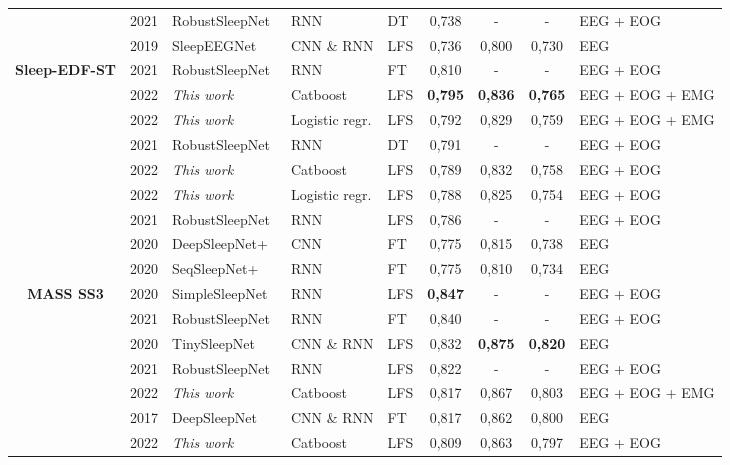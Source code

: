 \documentclass[runningheads]{llncs}
\begin{document}
\begin{table}[htbp]
{\begin{tabular}{c|p{}p{}p{}p{}|ccc|l}
 & 2021 & RobustSleepNet~\cite{guillot2021robustsleepnet} & RNN & DT & 0,738 & - & - & EEG + EOG \\
 & 2019 & SleepEEGNet~\cite{mousavi2019sleepeegnet} & CNN \& RNN & LFS & 0,736 & 0,800 & 0,730 & EEG \\
\midrule
\multirow{9}{*}{\textbf{Sleep-EDF-ST}} & 2021 & RobustSleepNet~\cite{guillot2021robustsleepnet} & RNN & FT & 0,810 & - & - & EEG + EOG \\
 & 2022 & \textit{This work} & Catboost & LFS & \textbf{0,795} & \textbf{0,836} & \textbf{0,765} & EEG + EOG + EMG \\
 & 2022 & \textit{This work} & Logistic regr. & LFS & 0,792 & 0,829 & 0,759 & EEG + EOG + EMG \\
 & 2021 & RobustSleepNet~\cite{guillot2021robustsleepnet} & RNN & DT & 0,791 & - & - & EEG + EOG \\
& 2022 & \textit{This work} & Catboost & LFS & 0,789 & 0,832 & 0,758 & EEG + EOG \\
 & 2022 & \textit{This work} & Logistic regr. & LFS & 0,788 & 0,825 & 0,754 & EEG + EOG \\
 & 2021 & RobustSleepNet~\cite{guillot2021robustsleepnet} & RNN & LFS & 0,786 & - & - & EEG + EOG \\
 & 2020 & DeepSleepNet+~\cite{phan2020towards} & CNN & FT & 0,775 & 0,815 & 0,738 & EEG \\
 & 2020 & SeqSleepNet+~\cite{phan2020towards} & RNN & FT & 0,775 & 0,810 & 0,734 & EEG \\
\midrule
\multirow{12}{*}{\textbf{MASS SS3}} & 2020 & SimpleSleepNet~\cite{guillot2020dreem__simplesleepnet} & RNN & LFS & \textbf{0,847} & - & - & EEG + EOG \\
 & 2021 & RobustSleepNet~\cite{guillot2021robustsleepnet} & RNN & FT & 0,840 & - & - & EEG + EOG \\
 & 2020 & TinySleepNet~\cite{supratak2020tinysleepnet} & CNN \& RNN & LFS & 0,832 & \textbf{0,875} & \textbf{0,820} & EEG \\
 & 2021 & RobustSleepNet~\cite{guillot2021robustsleepnet} & RNN & LFS & 0,822 & - & - & EEG + EOG \\
 & 2022 & \textit{This work} & Catboost & LFS & 0,817 & 0,867 & 0,803 & EEG + EOG + EMG \\
 & 2017 & DeepSleepNet~\cite{supratak2017deepsleepnet} & CNN \& RNN & FT & 0,817 & 0,862 & 0,800 & EEG \\
 & 2022 & \textit{This work} & Catboost & LFS & 0,809 & 0,863 & 0,797 & EEG + EOG \\

\end{tabular}}
\end{table}
\end{document}
